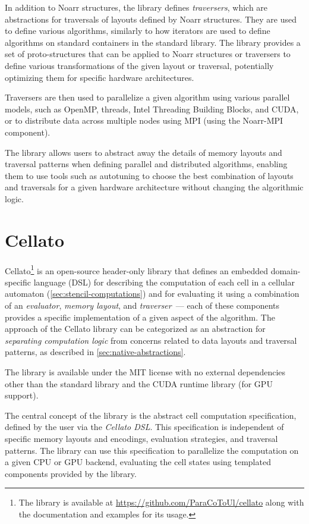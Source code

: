 In addition to Noarr structures, the library defines \emph{traversers}, which are abstractions for traversals of layouts defined by Noarr structures. They are used to define various algorithms, similarly to how iterators are used to define algorithms on standard containers in the \cpp standard library. The library provides a set of proto-structures that can be applied to Noarr structures or traversers to define various transformations of the given layout or traversal, potentially optimizing them for specific hardware architectures.

Traversers are then used to parallelize a given algorithm using various parallel models, such as OpenMP, \cpp threads, Intel Threading Building Blocks, and CUDA\@, or to distribute data across multiple nodes using MPI (using the Noarr-MPI component).

The library allows users to abstract away the details of memory layouts and traversal patterns when defining parallel and distributed algorithms, enabling them to use tools such as autotuning to choose the best combination of layouts and traversals for a given hardware architecture without changing the algorithmic logic.


\section{Cellato}\label{sec:sw-cellato}

Cellato\footnote{The library is available at \url{https://github.com/ParaCoToUl/cellato} along with the documentation and examples for its usage.} is an open-source \cpptwenty header-only library that defines an embedded domain-specific language (DSL) for describing the computation of each cell in a cellular automaton (\cref{sec:stencil-computations}) and for evaluating it using a combination of an \emph{evaluator}, \emph{memory layout}, and \emph{traverser}~--- each of these components provides a specific implementation of a given aspect of the algorithm. The approach of the Cellato library can be categorized as an abstraction for \emph{separating computation logic} from concerns related to data layouts and traversal patterns, as described in \cref{sec:native-abstractions}.

The library is available under the MIT license with no external dependencies other than the \cpp standard library and the CUDA runtime library (for GPU support).

The central concept of the library is the abstract cell computation specification, defined by the user via the \emph{Cellato DSL}. This specification is independent of specific memory layouts and encodings, evaluation strategies, and traversal patterns. The library can use this specification to parallelize the computation on a given CPU or GPU backend, evaluating the cell states using templated components provided by the library.

